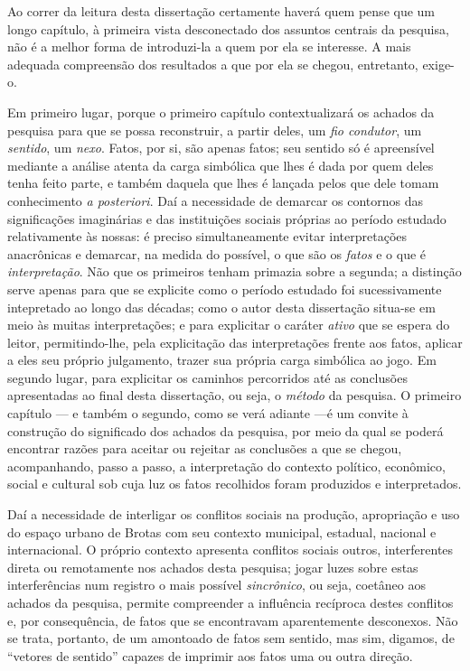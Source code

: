 Ao correr da leitura desta dissertação certamente haverá quem pense que um longo capítulo, à primeira vista desconectado dos assuntos centrais da pesquisa, não é a melhor forma de introduzi-la a quem por ela se interesse. A mais adequada compreensão dos resultados a que por ela se chegou, entretanto, exige-o.

Em primeiro lugar, porque o primeiro capítulo contextualizará os achados da pesquisa para que se possa reconstruir, a partir deles, um \textit{fio condutor}, um \textit{sentido}, um \textit{nexo}. Fatos, por si, são apenas fatos; seu sentido só é apreensível mediante a análise atenta da carga simbólica que lhes é dada por quem deles tenha feito parte, e também daquela que lhes é lançada pelos que dele tomam conhecimento \textit{a posteriori}. Daí a necessidade de demarcar os contornos das significações imaginárias e das instituições sociais próprias ao período estudado relativamente às nossas: é preciso simultaneamente evitar interpretações anacrônicas e demarcar, na medida do possível, o que são os \textit{fatos} e o que é \textit{interpretação}. Não que os primeiros tenham primazia sobre a segunda; a distinção serve apenas para que se explicite como o período estudado foi sucessivamente intepretado ao longo das décadas; como o autor desta dissertação situa-se em meio às muitas interpretações; e para explicitar o caráter \textit{ativo} que se espera do leitor, permitindo-lhe, pela explicitação das interpretações frente aos fatos, aplicar a eles seu próprio julgamento, trazer sua própria carga simbólica ao jogo. Em segundo lugar, para explicitar os caminhos percorridos até as conclusões apresentadas ao final desta dissertação, ou seja, o \textit{método} da pesquisa. O primeiro capítulo --- e também o segundo, como se verá adiante ---é um convite à construção do significado dos achados da pesquisa, por meio da qual se poderá encontrar razões para aceitar ou rejeitar as conclusões a que se chegou, acompanhando, passo a passo, a interpretação do contexto político, econômico, social e cultural sob cuja luz os fatos recolhidos foram produzidos e interpretados.

Daí a necessidade de interligar os conflitos sociais na produção, apropriação e uso do espaço urbano de Brotas com seu contexto municipal, estadual, nacional e internacional. O próprio contexto apresenta conflitos sociais outros, interferentes direta ou remotamente nos achados desta pesquisa; jogar luzes sobre estas interferências num registro o mais possível \textit{sincrônico}, ou seja, coetâneo aos achados da pesquisa, permite compreender a influência recíproca destes conflitos e, por consequência, de fatos que se encontravam aparentemente desconexos. Não se trata, portanto, de um amontoado de fatos sem sentido, mas sim, digamos, de ``vetores de sentido'' capazes de imprimir aos fatos uma ou outra direção.

